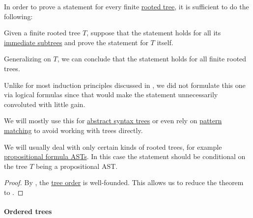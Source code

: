 \begin{theorem}\label{thm:induction_on_rooted_trees}\mimprovised
  In order to prove a statement for every finite \hyperref[def:rooted_tree]{rooted tree}, it is sufficient to do the following:
  \begin{displayquote}
    Given a finite rooted tree \( T \), suppose that the statement holds for all its \hyperref[def:rooted_tree/immediate_subtree]{immediate subtrees} and prove the statement for \( T \) itself.
  \end{displayquote}

  Generalizing on \( T \), we can conclude that the statement holds for all finite rooted trees.
\end{theorem}
\begin{comments}
  \item Unlike for most induction principles discussed in , we did not formulate this one via logical formulas since that would make the statement unnecessarily convoluted with little gain.

  \item We will mostly use this for \hyperref[con:abstract_syntax_tree]{abstract syntax trees} or even rely on \hyperref[con:evaluation]{pattern matching} to avoid working with trees directly.

  \item We will usually deal with only certain kinds of rooted trees, for example \hyperref[def:propositional_syntax/formula_ast]{propositional formula ASTs}. In this case the statement should be conditional on the tree \( T \) being a propositional AST.
\end{comments}
\begin{proof}
  By , the \hyperref[def:rooted_tree]{tree order} is well-founded. This allows us to reduce the theorem to .
\end{proof}

\paragraph{Ordered trees}

